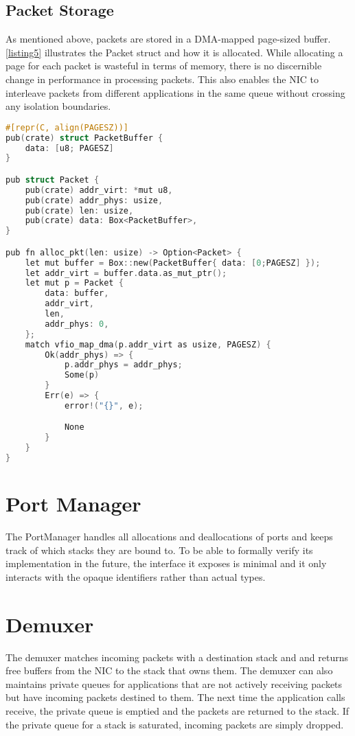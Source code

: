\subsection{Packet Storage}
As mentioned above, packets are stored in a DMA-mapped page-sized buffer. \ref{listing5} illustrates the Packet struct and how it is allocated. While allocating a page for each packet is wasteful in terms of memory, there is no discernible change in performance in processing packets. This also enables the NIC to interleave packets from different applications in the same queue without crossing any isolation boundaries.

\begin{lstlisting}[language=C]
#[repr(C, align(PAGESZ))]
pub(crate) struct PacketBuffer {
    data: [u8; PAGESZ]
}

pub struct Packet {
    pub(crate) addr_virt: *mut u8,
    pub(crate) addr_phys: usize,
    pub(crate) len: usize,
    pub(crate) data: Box<PacketBuffer>,
}

pub fn alloc_pkt(len: usize) -> Option<Packet> {
    let mut buffer = Box::new(PacketBuffer{ data: [0;PAGESZ] });
    let addr_virt = buffer.data.as_mut_ptr();
    let mut p = Packet {
        data: buffer,
        addr_virt,
        len,
        addr_phys: 0,
    };
    match vfio_map_dma(p.addr_virt as usize, PAGESZ) {
        Ok(addr_phys) => {
            p.addr_phys = addr_phys;
            Some(p)
        }
        Err(e) => {
            error!("{}", e);

            None
        }
    }
}
\end{lstlisting}


\section{Port Manager}
The PortManager handles all allocations and deallocations of ports and keeps track of which stacks they are bound to. To be able to formally verify its implementation in the future, the interface it exposes is minimal and it only interacts with the opaque identifiers rather than actual types. 

\section{Demuxer}
The demuxer matches incoming packets with a destination stack and and returns free buffers from the NIC to the stack that owns them. The demuxer can also maintains private queues for applications that are not actively receiving packets but have incoming packets destined to them. The next time the application calls receive, the private queue is emptied and the packets are returned to the stack. If the private queue for a stack is saturated, incoming packets are simply dropped.

